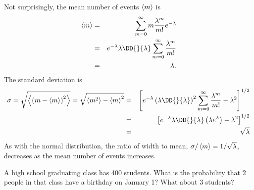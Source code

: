 Not surprisingly, the mean number of events $\left\langle m\right\rangle$ is
\begin{eqnarray*}
	\mean{m} &=& \sum_{m=0}^{\infty} m \frac{\lambda^{m}}{m!}e^{-\lambda}\\
		&=& e^{-\lambda} \lambda \DD{}{\lambda}\sum_{m=0}^{\infty} \frac{\lambda^{m}}{m!}\\
		&=& \lambda.
\end{eqnarray*}
The standard deviation is
\begin{eqnarray*}
	\sigma = \sqrt{\mean{\left(m-\mean{m}\right)^{2}}} = \sqrt{\mean{m^{2}}-\mean{m}^{2}}
		&=& \left[e^{-\lambda}\left(\lambda\DD{}{\lambda}\right)^{2}\sum_{m=0}^{\infty}\frac{\lambda^{m}}{m!}-\lambda^{2}\right]^{1/2}\\
		&=& \left[e^{-\lambda}\lambda\DD{}{\lambda}\left(\lambda e^{\lambda}\right)-\lambda^{2}\right]^{1/2}\\
		&=& \sqrt{\lambda}
\end{eqnarray*}
As with the normal distribution, the ratio of width to mean, $\sigma/\left\langle m\right\rangle = 1/\sqrt{\lambda}$, decreases as the mean number of events increases.  

\begin{exercisebox}
A high school graduating class has 400 students.  What is the probability that 2 people in that class have a birthday on January 1?  What about 3 students?
\end{exercisebox}

